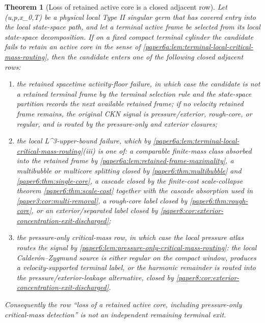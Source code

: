\documentclass[11pt]{amsart}
\def\({}%
\def\){}%
\theoremstyle{plain}
\newtheorem{theorem}{Theorem}[section]
\theoremstyle{definition}
\theoremstyle{remark}
\begin{document}
\begin{theorem}[Loss of retained active core is a closed adjacent row]
\label{paper6:thm:active-core-loss-closed}
Let \((u,p,x_0,T)\) be a physical local Type II singular germ that has
covered entry into the local state-space path, and let a terminal active
frame be selected from its local state-space decomposition.  If on a fixed
compact terminal cylinder the candidate fails to retain an active core in
the sense of \cref{paper6a:lem:terminal-local-critical-mass-routing}, then
the candidate enters one of the following closed adjacent rows:
\begin{enumerate}[label=\textup{(\roman*)}]
\item the retained spacetime activity-floor failure, in which case the candidate is
not a retained terminal frame by the terminal selection rule and the
state-space partition records the next available retained frame; if no velocity
retained frame remains, the original CKN signal is pressure/exterior,
rough-core, or regular, and is routed by the pressure-only and exterior
closures;
\item the local \(L^3\)-upper-bound failure, which by
\cref{paper6a:lem:terminal-local-critical-mass-routing}\textup{(iii)} is
one of: a comparable finite-mass class absorbed into the retained frame by
\cref{paper6a:lem:retained-frame-maximality}, a multibubble or multicore
splitting closed by \cref{paper6:thm:multibubble} and
\cref{paper6:thm:single-core}, a cascade closed by the finite-cost
scale-collapse theorem \cref{paper6:thm:scale-cost} together with the
cascade absorption used in \cref{paper3:cor:multi-removal}, a rough-core
label closed by \cref{paper6:thm:rough-core}, or an exterior/separated
label closed by
\cref{paper8:cor:exterior-concentration-exit-discharged};
\item the pressure-only critical-mass row, in which case the local pressure
atlas routes the signal by
\cref{paper6:lem:pressure-only-critical-mass-routing}: the local
Calder\'on--Zygmund source is either regular on the compact window, produces a
velocity-supported terminal label, or the harmonic remainder is routed into the
pressure/exterior-leakage alternative, closed by
\cref{paper8:cor:exterior-concentration-exit-discharged}.
\end{enumerate}
Consequently the row ``loss of a retained active core, including
pressure-only critical-mass detection'' is not an independent remaining
terminal exit.
\end{theorem}
\end{document}
